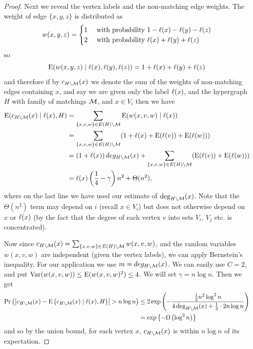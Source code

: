 \documentclass[12pt,reqno]{amsart}
\begin{document}
\begin{proof}
Next we reveal the vertex labels and the non-matching edge weights. The weight of edge $\{x, y, z\}$ is distributed as 
\[ w(x,y,z) = \begin{cases} 
      1 & \mbox{ with probability }   1 - \ell(x)-\ell(y)-\ell(z) \\
      2 & \mbox{ with probability }  \ell(x)+\ell(y)+\ell(z) 
   \end{cases}
\]
so 
\[
\mathrm{E}(w(x,y,z)\;|\;\ell(x), \ell(y), \ell(z)) =  1 + \ell(x)+\ell(y)+\ell(z)
\]
and therefore if by $c_{H \setminus \mathcal{M}}(x)$ we denote the sum of the weights of non-matching edges containing $x$, and say we are given only the label $\ell(x)$, and the hypergraph $H$ with family of matchings $\mathcal{M}$, and $x \in V_i$ then we have
\begin{align*}
\mathrm{E}(c_{H \setminus \mathcal{M}}(x)\; |\; \ell(x), H) &= \sum_{\{x, v, w \}\in E(H) \setminus \mathcal{M}} \mathrm{E}(w(x,v,w)\;|\;\ell(x))\\
& = \sum_{\{x, v, w \}\in E(H)\setminus \mathcal{M}} (1 + \ell(x)+\mathrm{E}(\ell(v))+\mathrm{E}(\ell(w)))\\
&= \left( 1+ \ell(x) \right) deg_{H \setminus \mathcal{M}}(x) + \sum_{\{x, v, w \}\in E(H)\setminus \mathcal{M}} (\mathrm{E}(\ell(v))+\mathrm{E}(\ell(w)) )\\
&=  \ell(x) \left( \frac 14 - \gamma \right)n^2   + \Theta(n^2),
\end{align*}
where on the last line we have used our estimate of $\deg_{H \setminus \mathcal{M}}(x)$. Note that the $\Theta(n^2)$ term may depend on $i$ (recall $x \in V_i$) but does not otherwise depend on $x$ or $\ell(x)$ (by the fact that the degree of each vertex $v$ into sets $V_i$, $V_j$ etc. is concentrated).

Now since $c_{H \setminus \mathcal{M}}(x) =  \sum_{\{x, v, w \}\in E(H) \setminus \mathcal{M}} w(x, v, w)$, and the random variables $w(x,v,w)$ are independent (given the vertex labels), we can apply Bernstein's inequality. For our application we use $m =deg_{H \setminus \mathcal{M}}(x)$. We can easily use $C=2$, and put $\mathrm{Var}(w(x, v, w)) \le \mathrm{E}(w(x, v, w)^2) \le 4$. We will set $\gamma = n \log n$. Then we get 
\begin{align*}
\Pr \left (\left|c_{H \setminus \mathcal{M}}(x)  -\mathrm{E}\left(c_{H \setminus \mathcal{M}}(x)\;|\;\ell(x), H\right) \right| > n \log n \right ) 
&\leq 2\exp \left ( -\frac{\tfrac{1}{2} n^2 \log^2 n}{4\deg_{H \setminus \mathcal{M}}(x)+\tfrac{1}{3} \cdot  2 n \log n} \right )\\
& = \exp\left\{ -\Omega \left(\log^2 n \right) \right\}
\end{align*}
and so by the union bound, \whp for each vertex $x$, $c_{H \setminus \mathcal{M}}(x)$ is within $n \log n$ of its expectation. 


\end{proof}
\end{document}
